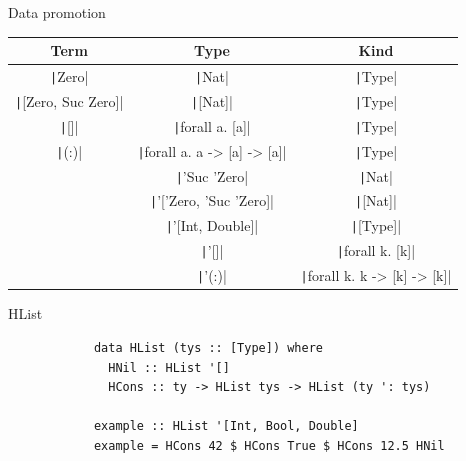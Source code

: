     \begin{frame}[fragile]{Data promotion}
        \begin{tabular}{|c|c|c|}
            \hline
            Term                                   & Type                                            & Kind                                            \\
            \hline
            \texttt|Zero|             & \texttt|Nat|                       & \texttt|Type|                      \\
            \texttt|[Zero, Suc Zero]| & \texttt|[Nat]|                     & \texttt|Type|                      \\
            \texttt|[]|               & \texttt|forall a. [a]|             & \texttt|Type|                      \\
            \texttt|(:)|              & \texttt|forall a. a -> [a] -> [a]| & \texttt|Type|                      \\
            & \texttt|'Suc 'Zero|                & \texttt|Nat|                       \\
            & \texttt|'['Zero, 'Suc 'Zero]|      & \texttt|[Nat]|                     \\
            & \texttt|'[Int, Double]|            & \texttt|[Type]|                    \\
            & \texttt|'[]|                       & \texttt|forall k. [k]|             \\
            & \texttt|'(:)|                      & \texttt|forall k. k -> [k] -> [k]| \\
            \hline
        \end{tabular}
    \end{frame}

    \begin{frame}[fragile]{HList}
        \pause
        \begin{verbatim}
            data HList (tys :: [Type]) where
              HNil :: HList '[]
              HCons :: ty -> HList tys -> HList (ty ': tys)

            example :: HList '[Int, Bool, Double]
            example = HCons 42 $ HCons True $ HCons 12.5 HNil
        \end{verbatim}
    \end{frame}

